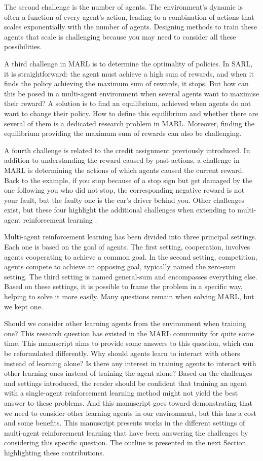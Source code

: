 The second challenge is the number of agents.
The environment's dynamic is often a function of every agent's action, leading to a combination of actions that scales exponentially with the number of agents.
Designing methods to train these agents that scale is challenging because you may need to consider all these possibilities.

A third challenge in MARL is to determine the optimality of policies.
In SARL, it is straightforward: the agent must achieve a high sum of rewards, and when it finds the policy achieving the maximum sum of rewards, it stops.
But how can this be posed in a multi-agent environment when several agents want to maximise their reward?
A solution is to find an equilibrium, achieved when agents do not want to change their policy.
How to define this equilibrium and whether there are several of them is a dedicated research problem in MARL.
Moreover, finding the equilibrium providing the maximum sum of rewards can also be challenging.

A fourth challenge is related to the credit assignment previously introduced.
In addition to understanding the reward caused by past actions, a challenge in MARL is determining the actions of which agents caused the current reward.
Back to the example, if you stop because of a stop sign but get damaged by the one following you who did not stop, the corresponding negative reward is not your fault, but the faulty one is the car's driver behind you.
Other challenges exist, but these four highlight the additional challenges when extending to multi-agent reinforcement learning \cite{marl-book}.

Multi-agent reinforcement learning has been divided into three principal settings.
Each one is based on the goal of agents.
The first setting, cooperation, involves agents cooperating to achieve a common goal.
In the second setting, competition, agents compete to achieve an opposing goal, typically named the zero-sum setting.
The third setting is named general-sum and encompasses everything else.
Based on these settings, it is possible to frame the problem in a specific way, helping to solve it more easily.
Many questions remain when solving MARL, but we kept one.

Should we consider other learning agents from the environment when training one?
This research question has existed in the MARL community for quite some time.
This manuscript aims to provide some answers to this question, which can be reformulated differently.
Why should agents learn to interact with others instead of learning alone?
Is there any interest in training agents to interact with other learning ones instead of training the agent alone?
Based on the challenges and settings introduced, the reader should be confident that training an agent with a single-agent reinforcement learning method might not yield the best answer to these problems.
And this manuscript goes toward demonstrating that we need to consider other learning agents in our environment, but this has a cost and some benefits.
This manuscript presents works in the different settings of multi-agent reinforcement learning that have been answering the challenges by considering this specific question.
The outline is presented in the next Section, highlighting these contributions.

